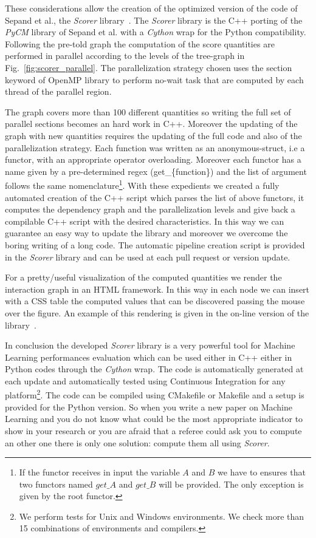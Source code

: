 \documentclass{standalone}
\begin{document}
These considerations allow the creation of the optimized version of the code of Sepand et al., the \emph{Scorer} library~\cite{Scorer}.
The \emph{Scorer} library is the C++ porting of the \emph{PyCM} library of Sepand et al. with a \emph{Cython} wrap for the Python compatibility.
Following the pre-told graph the computation of the score quantities are performed in parallel according to the levels of the tree-graph in Fig.~\ref{fig:scorer_parallel}.
The parallelization strategy chosen uses the \textsf{section} keyword of OpenMP library to perform no-wait task that are computed by each thread of the parallel region.

The graph covers more than 100 different quantities so writing the full set of parallel sections becomes an hard work in C++.
Moreover the updating of the graph with new quantities requires the updating of the full code and also of the parallelization strategy.
Each function was written as an anonymous-struct, i.e a functor, with an appropriate operator overloading.
Moreover each functor has a name given by a pre-determined regex (\textsf{get\_\{function\}}) and the list of argument follows the same nomenclature\footnote{
  If the functor receives in input the variable $A$ and $B$ we have to ensures that two functors named $get\_A$ and $get\_B$ will be provided.
  The only exception is given by the root functor.
}.
With these expedients we created a fully automated creation of the C++ script which parses the list of above functors, it computes the dependency graph and the parallelization levels and give back a compilable C++ script with the desired characteristics.
In this way we can guarantee an easy way to update the library and moreover we overcome the boring writing of a long code.
The automatic pipeline creation script is provided in the \emph{Scorer} library and can be used at each pull request or version update.

For a pretty/useful visualization of the computed quantities we render the interaction graph in an HTML framework.
In this way in each node we can insert with a CSS table the computed values that can be discovered passing the mouse over the figure.
An example of this rendering is given in the on-line version of the library~\cite{Scorer}.

In conclusion the developed \emph{Scorer} library is a very powerful tool for Machine Learning performances evaluation which can be used either in C++ either in Python codes through the \emph{Cython} wrap.
The code is automatically generated at each update and automatically tested using Continuous Integration for any platform\footnote{
  We perform tests for Unix and Windows environments.
  We check more than 15 combinations of environments and compilers.
}.
The code can be compiled using CMakefile or Makefile and a setup is provided for the Python version.
So when you write a new paper on Machine Learning and you do not know what could be the most appropriate indicator to show in your research or you are afraid that a referee could ask you to compute an other one there is only one solution: compute them all using \emph{Scorer}.
\end{document}
